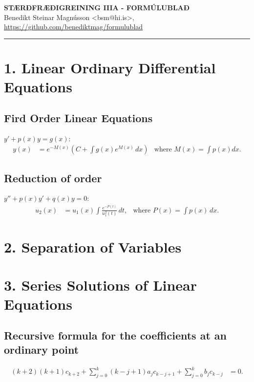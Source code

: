 \documentclass[11pt,icelandic]{article}
\begin{document}

\begin{center}
	{\Large\bf STÆRÐFRÆÐIGREINING IIIA - FORMÚLUBLAÐ}\\
    Benedikt Steinar Magnússon <bsm@hi.is>, \url{https://github.com/benediktmag/formulublad}
\end{center}

\hrule

\section*{1. Linear Ordinary Differential Equations}

\subsection*{Fird Order Linear Equations}
$y'+p(x)y=g(x)$:
\begin{align*}
 y(x) &= e^{-M(x)}\left(C+\int g(x) e^{M(x)}\, dx\right)
 & \text{where } M(x) = \int p(x) dx.
\end{align*}

\subsection*{Reduction of order}
$y'' + p(x)y' + q(x)y=0$:
\begin{align*}
 u_2(x)&= u_1(x) \int \frac{e^{-P(t)}}{u_1^2(t)}\, dt, 
&\text{where } P(x) =  \int p(x)\, dx.
\end{align*}

\section*{2. Separation of Variables}

\section*{3. Series Solutions of Linear Equations}

\subsection*{Recursive formula for the coefficients at an ordinary point}
\begin{align*}
    (k+2)(k+1)c_{k+2} + \sum_{j=0}^{k} (k-j+1)a_jc_{k-j+1} + \sum_{j=0}^{k}b_jc_{k-j} &= 0. 
\end{align*}
\end{document}
